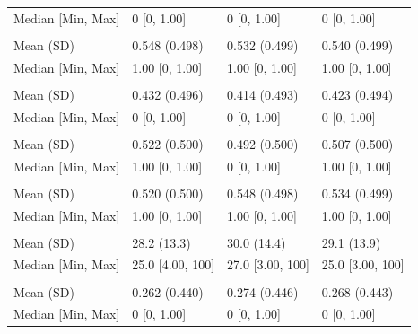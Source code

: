 \documentclass[smallextended]{svjour3}
\newenvironment{knitrout}{}{} %
\begin{document}
\begin{knitrout}
\begin{tabular}[t]{llll}
\hspace{1em}Median [Min, Max] & 0 [0, 1.00] & 0 [0, 1.00] & 0 [0, \vphantom{2} 1.00]\\
\addlinespace[0.3em]
\multicolumn{4}{l}{\textbf{z2}}\\
\hspace{1em}Mean (SD) & 0.548 (0.498) & 0.532 (0.499) & 0.540 (0.499)\\
\hspace{1em}Median [Min, Max] & 1.00 [0, 1.00] & 1.00 [0, 1.00] & 1.00 [0, \vphantom{1} 1.00]\\
\addlinespace[0.3em]
\multicolumn{4}{l}{\textbf{z3}}\\
\hspace{1em}Mean (SD) & 0.432 (0.496) & 0.414 (0.493) & 0.423 (0.494)\\
\hspace{1em}Median [Min, Max] & 0 [0, 1.00] & 0 [0, 1.00] & 0 [0, \vphantom{1} 1.00]\\
\addlinespace[0.3em]
\multicolumn{4}{l}{\textbf{z4}}\\
\hspace{1em}Mean (SD) & 0.522 (0.500) & 0.492 (0.500) & 0.507 (0.500)\\
\hspace{1em}Median [Min, Max] & 1.00 [0, 1.00] & 0 [0, 1.00] & 1.00 [0, 1.00]\\
\addlinespace[0.3em]
\multicolumn{4}{l}{\textbf{z5}}\\
\hspace{1em}Mean (SD) & 0.520 (0.500) & 0.548 (0.498) & 0.534 (0.499)\\
\hspace{1em}Median [Min, Max] & 1.00 [0, 1.00] & 1.00 [0, 1.00] & 1.00 [0, 1.00]\\
\addlinespace[0.3em]
\multicolumn{4}{l}{\textbf{size}}\\
\hspace{1em}Mean (SD) & 28.2 (13.3) & 30.0 (14.4) & 29.1 (13.9)\\
\hspace{1em}Median [Min, Max] & 25.0 [4.00, 100] & 27.0 [3.00, 100] & 25.0 [3.00, 100]\\
\addlinespace[0.3em]
\multicolumn{4}{l}{\textbf{grade3}}\\
\hspace{1em}Mean (SD) & 0.262 (0.440) & 0.274 (0.446) & 0.268 (0.443)\\
\hspace{1em}Median [Min, Max] & 0 [0, 1.00] & 0 [0, 1.00] & 0 [0, 1.00]\\

\end{tabular}
\end{knitrout}
\end{document}
